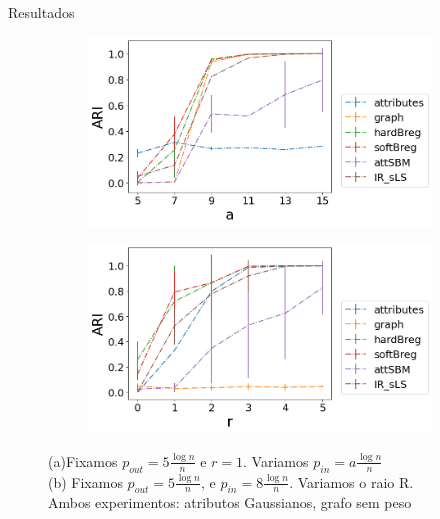 \documentclass[aspectratio=169]{beamer}
\begin{document}
\begin{frame}{Resultados}
	
	
	\hspace*{10px}
	\begin{figure}[!ht]
		\centering
		\begin{subfigure}[b]{0.4\textwidth}
			\includegraphics[width=\textwidth]{img/varying_a.png}
		\end{subfigure}
		\hfill
		\begin{subfigure}[b]{0.4\textwidth}
			\includegraphics[width=\textwidth]{img/varying_r.png}
		\end{subfigure}
		    \caption{(a)Fixamos $p_{out} = 5 \frac{\log n}{n}$ e $r=1$. Variamos $p_{in} = a \frac{\log n}{n}$\\
			    (b) Fixamos $p_{out} = 5 \frac{\log n}{n}$, e $p_{in} = 8 \frac{\log n}{n}$. Variamos o raio R.\\ Ambos experimentos: atributos Gaussianos, grafo sem peso}
	\end{figure}
\end{frame}
\end{document}
